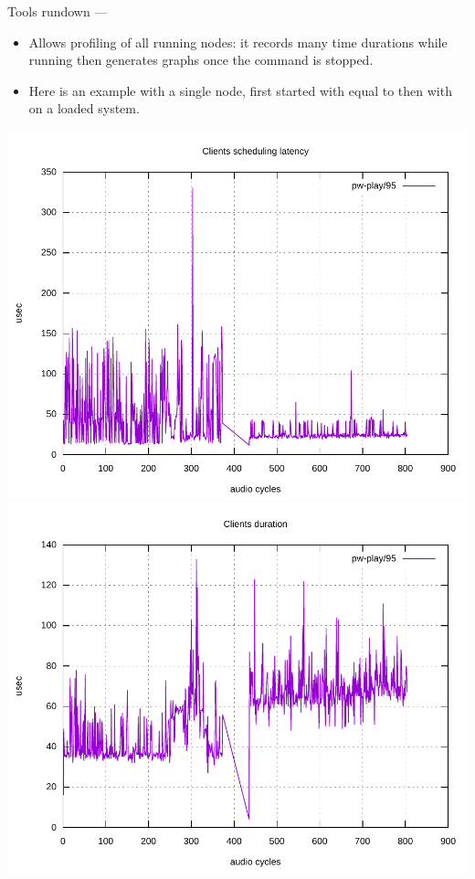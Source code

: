 \begin{frame}{Tools rundown — }
  \begin{itemize}

  \item Allows profiling of all running nodes: it records many time
    durations while running then generates graphs once the command is
    stopped.

  \item Here is an example with a single  node, first
    started with  equal to
     then with  on a loaded
    system.

  \end{itemize}

  \begin{center}
    \includegraphics[height=0.5\textheight]{slides/audio-pipewire/pw-profiler-scheduling.pdf}
    \includegraphics[height=0.5\textheight]{slides/audio-pipewire/pw-profiler-exectime.pdf}
  \end{center}
\end{frame}



